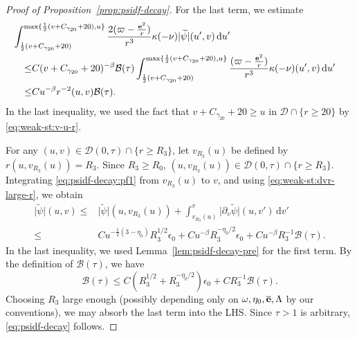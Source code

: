 \documentclass[10pt, reqno]{amsart}
\theoremstyle{definition}
\theoremstyle{remark}
\theoremstyle{conjecture}
\numberwithin{equation}{section}
\newcommand{\abs}[1]{\vert#1\vert}
\newcommand{\set}[1]{\{#1\}}
\newcommand{\ud}{\mathrm{d}}
\newcommand{\rd}{\partial}
\newcommand{\0}{\emptyset}
\newcommand{\bt}{\beta}
\newcommand{\gmm}{\gamma}
\newcommand{\eps}{\epsilon}
\newcommand{\kpp}{\kappa}
\newcommand{\Lmb}{\Lambda}
\newcommand{\omg}{\omega}
\newcommand{\bfe}{{\bf e}}
\newcommand{\calB}{\mathcal B}
\newcommand{\calD}{\mathcal D}
\newcommand{\dur}{\nu}
\newcommand{\e}{\bfe}							%
\newcommand{\psibg}{\overline{\psi}}				%
\newcommand{\ebg}{\overline{\e}}					%
\newcommand{\psidf}{\widetilde{\psi}}				%
\begin{document}
\begin{proof}[Proof of Proposition~\ref{prop:psidf-decay}]
For the last term, we estimate
\begin{align*}
& \hskip-2em
\int_{\frac{1}{2}(v + C_{\gmm_{20}}+20)}^{\max\set{\frac{1}{2}(v + C_{\gmm_{20}}+20), u}} \frac{2 (\varpi - \frac{\e^{2}}{r})}{r^{3}} \kpp (-\dur) \abs{\psidf} (u', v) \, \ud u' \\
\leq & C (v + C_{\gmm_{20}}+20)^{-\bt} \calB(\tau) \int_{\frac{1}{2}(v + C_{\gmm_{20}}+ 20)}^{\max\set{\frac{1}{2}(v + C_{\gmm_{20}}+20), u}} \frac{(\varpi - \frac{\e^{2}}{r})}{r^{3}} \kpp (-\dur)  (u', v) \, \ud u' \\
\leq & C u^{-\bt} r^{-2}(u, v) \calB(\tau) .
\end{align*}
In the last inequality, we used the fact that $v+C_{\gmm_{20}} + 20 \geq u$ in $\calD \cap \set{r \geq 20}$ by \eqref{eq:weak-st:v-u-r}.

For any $(u, v) \in \calD(0, \tau) \cap \set{r \geq R_{3}}$, let $v_{R_{3}}(u)$ be defined by $r(u, v_{R_{3}}(u)) = R_{3}$. Since $R_{3} \geq R_{0}$, $(u, v_{R_{3}}(u)) \in \calD(0, \tau) \cap \set{r \geq R_{3}}$. Integrating \eqref{eq:psidf-decay:pf1} from $v_{R_{3}}(u)$ to $v$, and using \eqref{eq:weak-st:dvr-large-r}, we obtain
\begin{align*}
	\abs{\psidf} (u,v) 
\leq & \abs{\psidf}(u, v_{R_{3}}(u)) + \int_{v_{R_{3}}(u)}^{v} \abs{\rd_{v} \psidf}(u, v') \, \ud v' \\
\leq & C u^{-\frac{1}{2}(3-\eta_{0})} R_{3}^{1/2} \eps_{0} + C u^{-\bt} R_{3}^{-\eta_{0}/2} \eps_{0} + C u^{-\bt} R_{3}^{-1} \calB(\tau).
\end{align*}
In the last inequality, we used Lemma~\ref{lem:psidf-decay-pre} for the first term. By the definition of $\calB(\tau)$, we have
\begin{equation*}
	\calB(\tau) \leq C (R_{3}^{1/2} + R_{3}^{-\eta_{0}/2}) \eps_{0} + C R_{3}^{-1} \calB(\tau).
\end{equation*}
Choosing $R_{3}$ large enough (possibly depending only on $\omg, \eta_{0}, \ebg, \Lmb$ by our conventions), we may absorb the last term into the LHS. Since $\tau > 1$ is arbitrary, \eqref{eq:psidf-decay} follows. \qedhere

\end{proof}
\end{document}
